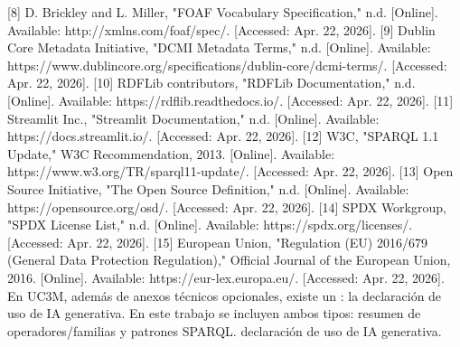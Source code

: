 {}[8] D. Brickley and L. Miller, "FOAF Vocabulary Specification," n.d. [Online]. Available: http://xmlns.com/foaf/spec/. [Accessed: Apr. 22, 2026].\markdownRendererInterblockSeparator
{}[9] Dublin Core Metadata Initiative, "DCMI Metadata Terms," n.d. [Online]. Available: https://www.dublincore.org/specifications/dublin-core/dcmi-terms/. [Accessed: Apr. 22, 2026].\markdownRendererInterblockSeparator
{}[10] RDFLib contributors, "RDFLib Documentation," n.d. [Online]. Available: https://rdflib.readthedocs.io/. [Accessed: Apr. 22, 2026].\markdownRendererInterblockSeparator
{}[11] Streamlit Inc., "Streamlit Documentation," n.d. [Online]. Available: https://docs.streamlit.io/. [Accessed: Apr. 22, 2026].\markdownRendererInterblockSeparator
{}[12] W3C, "SPARQL 1.1 Update," W3C Recommendation, 2013. [Online]. Available: https://www.w3.org/TR/sparql11-update/. [Accessed: Apr. 22, 2026].\markdownRendererInterblockSeparator
{}[13] Open Source Initiative, "The Open Source Definition," n.d. [Online]. Available: https://opensource.org/osd/. [Accessed: Apr. 22, 2026].\markdownRendererInterblockSeparator
{}[14] SPDX Workgroup, "SPDX License List," n.d. [Online]. Available: https://spdx.org/licenses/. [Accessed: Apr. 22, 2026].\markdownRendererInterblockSeparator
{}[15] European Union, "Regulation (EU) 2016/679 (General Data Protection Regulation)," Official Journal of the European Union, 2016. [Online]. Available: https://eur-lex.europa.eu/. [Accessed: Apr. 22, 2026].\markdownRendererInterblockSeparator
{}\markdownRendererHorizontalRule{}\markdownRendererInterblockSeparator
{}\markdownRendererInterblockSeparator
{}En UC3M, además de anexos técnicos opcionales, existe un : la declaración de uso de IA generativa. En este trabajo se incluyen ambos tipos:\markdownRendererInterblockSeparator
{}\markdownRendererUlBeginTight
\markdownRendererUlItem {} resumen de operadores/familias y patrones SPARQL.\markdownRendererUlItemEnd 
\markdownRendererUlItem {} declaración de uso de IA generativa.\markdownRendererUlItemEnd 
\markdownRendererUlEndTight \markdownRendererInterblockSeparator
{}\markdownRendererInterblockSeparator
